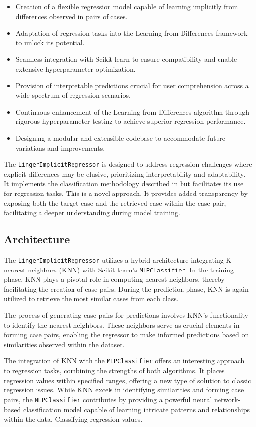\documentclass[a4paper, 12pt]{report}
\begin{document}
\begin{itemize}
\item Creation of a flexible regression model capable of learning implicitly from differences observed in pairs of cases.
\item Adaptation of regression tasks into the Learning from Differences framework to unlock its potential.
\item Seamless integration with Scikit-learn to ensure compatibility and enable extensive hyperparameter optimization.
\item Provision of interpretable predictions crucial for user comprehension across a wide spectrum of regression scenarios.
\item Continuous enhancement of the Learning from Differences algorithm through rigorous hyperparameter testing to achieve superior regression performance.
\item Designing a modular and extensible codebase to accommodate future variations and improvements.
\end{itemize}

The \texttt{LingerImplicitRegressor} is designed to address regression challenges where explicit differences may be elusive, prioritizing interpretability and adaptability. 
It implements the classification methodology described in \cite{ye2021learning} but facilitates its use for regression tasks. This is a novel approach.
It provides added transparency by exposing both the target case and the retrieved case within the case pair, facilitating a deeper understanding during model training.

\subsection{Architecture}
The \texttt{LingerImplicitRegressor} utilizes a hybrid architecture integrating K-nearest neighbors (KNN) with Scikit-learn's \texttt{MLPClassifier}. 
In the training phase, KNN plays a pivotal role in computing nearest neighbors, thereby facilitating the creation of case pairs. 
During the prediction phase, KNN is again utilized to retrieve the most similar cases from each class.

The process of generating case pairs for predictions involves KNN's functionality to identify the nearest neighbors. 
These neighbors serve as crucial elements in forming case pairs, enabling the regressor to make informed predictions based on similarities observed within the dataset.

The integration of KNN with the \texttt{MLPClassifier} offers an interesting approach to regression tasks, combining the strengths of both algorithms. 
It places regression values within specified ranges, offering a new type of solution to classic regression issues.
While KNN excels in identifying similarities and forming case pairs, the \texttt{MLPClassifier} contributes 
by providing a powerful neural network-based classification model capable of learning intricate patterns and relationships within the data. Classifying regression values.
\end{document}
